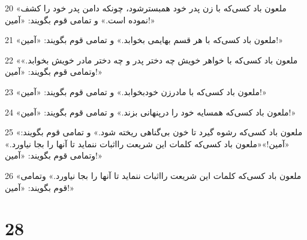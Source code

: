 \par 20 «ملعون باد کسی‌که با زن پدر خود همبسترشود، چونکه دامن پدر خود را کشف نموده است.» و تمامی قوم بگویند: «آمین!»
\par 21 «ملعون باد کسی‌که با هر قسم بهایمی بخوابد.» و تمامی قوم بگویند: «آمین!»
\par 22 «ملعون باد کسی‌که با خواهر خویش چه دختر پدر و چه دختر مادر خویش بخوابد.» وتمامی قوم بگویند: «آمین!»
\par 23 «ملعون باد کسی‌که با مادر‌زن خودبخوابد.» و تمامی قوم بگویند: «آمین!»
\par 24 «ملعون باد کسی‌که همسایه خود را درپنهانی بزند.» و تمامی قوم بگویند: «آمین!»
\par 25 «ملعون باد کسی‌که رشوه گیرد تا خون بی‌گناهی ریخته شود.» و تمامی قوم بگویند: «آمین!»«ملعون باد کسی‌که کلمات این شریعت رااثبات ننماید تا آنها را بجا نیاورد.» وتمامی قوم بگویند: «آمین!»
\par 26 «ملعون باد کسی‌که کلمات این شریعت رااثبات ننماید تا آنها را بجا نیاورد.» وتمامی قوم بگویند: «آمین!»
 
\chapter{28}

